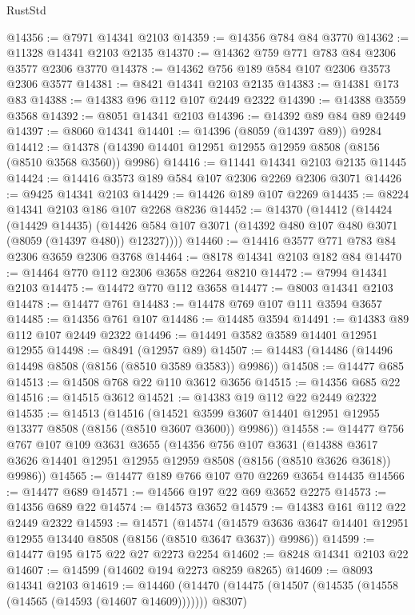 \begin{lexlean}{RustStd}
\begin{coremodule}
@14356 := @7971 @14341 @2103
@14359 := @14356 @784 @84 @3770
@14362 := @11328 @14341 @2103 @2135
@14370 := @14362 @759 @771 @783 @84 @2306 @3577 @2306 @3770
@14378 := @14362 @756 @189 @584 @107 @2306 @3573 @2306 @3577
@14381 := @8421 @14341 @2103 @2135
@14383 := @14381 @173 @83
@14388 := @14383 @96 @112 @107 @2449 @2322
@14390 := @14388 @3559 @3568
@14392 := @8051 @14341 @2103
@14396 := @14392 @89 @84 @89 @2449
@14397 := @8060 @14341
@14401 := @14396 (@8059 (@14397 @89)) @9284
@14412 := @14378 (@14390 @14401 @12951 @12955 @12959 @8508 (@8156 (@8510 @3568 @3560)) @9986)
@14416 := @11441 @14341 @2103 @2135 @11445
@14424 := @14416 @3573 @189 @584 @107 @2306 @2269 @2306 @3071
@14426 := @9425 @14341 @2103
@14429 := @14426 @189 @107 @2269
@14435 := @8224 @14341 @2103 @186 @107 @2268 @8236
@14452 := @14370
    (@14412
      (@14424
        (@14429 @14435)
        (@14426 @584 @107 @3071 (@14392 @480 @107 @480 @3071 (@8059 (@14397 @480)) @12327))))
@14460 := @14416 @3577 @771 @783 @84 @2306 @3659 @2306 @3768
@14464 := @8178 @14341 @2103 @182 @84
@14470 := @14464 @770 @112 @2306 @3658 @2264 @8210
@14472 := @7994 @14341 @2103
@14475 := @14472 @770 @112 @3658
@14477 := @8003 @14341 @2103
@14478 := @14477 @761
@14483 := @14478 @769 @107 @111 @3594 @3657
@14485 := @14356 @761 @107
@14486 := @14485 @3594
@14491 := @14383 @89 @112 @107 @2449 @2322
@14496 := @14491 @3582 @3589 @14401 @12951 @12955
@14498 := @8491 (@12957 @89)
@14507 := @14483 (@14486 (@14496 @14498 @8508 (@8156 (@8510 @3589 @3583)) @9986))
@14508 := @14477 @685
@14513 := @14508 @768 @22 @110 @3612 @3656
@14515 := @14356 @685 @22
@14516 := @14515 @3612
@14521 := @14383 @19 @112 @22 @2449 @2322
@14535 := @14513
    (@14516
      (@14521 @3599 @3607 @14401 @12951 @12955 @13377 @8508 (@8156 (@8510 @3607 @3600)) @9986))
@14558 := @14477
    @756
    @767
    @107
    @109
    @3631
    @3655
    (@14356
      @756
      @107
      @3631
      (@14388 @3617 @3626 @14401 @12951 @12955 @12959 @8508 (@8156 (@8510 @3626 @3618)) @9986))
@14565 := @14477 @189 @766 @107 @70 @2269 @3654 @14435
@14566 := @14477 @689
@14571 := @14566 @197 @22 @69 @3652 @2275
@14573 := @14356 @689 @22
@14574 := @14573 @3652
@14579 := @14383 @161 @112 @22 @2449 @2322
@14593 := @14571
    (@14574
      (@14579 @3636 @3647 @14401 @12951 @12955 @13440 @8508 (@8156 (@8510 @3647 @3637)) @9986))
@14599 := @14477 @195 @175 @22 @27 @2273 @2254
@14602 := @8248 @14341 @2103 @22
@14607 := @14599 (@14602 @194 @2273 @8259 @8265)
@14609 := @8093 @14341 @2103
@14619 := @14460
    (@14470 (@14475 (@14507 (@14535 (@14558 (@14565 (@14593 (@14607 @14609))))))) @8307)

\end{coremodule}
\end{lexlean}
